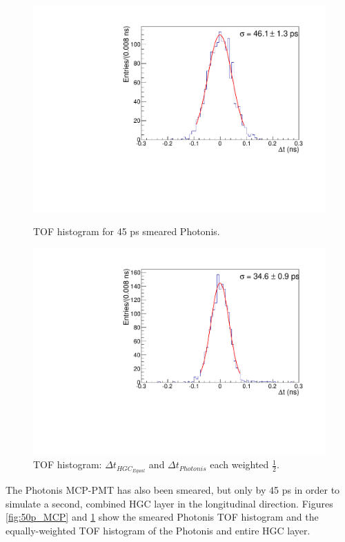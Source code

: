 \documentclass[twocolumn,aps,prd,reprint,superscriptaddress,floatfix]{revtex4-1}
\begin{document}
\begin{figure}[!htbp]
\centering
\begin{minipage}[t]{.49\textwidth}
	\centering
	\includegraphics[width=\linewidth]{deltaTMCPSmear50.pdf}
	\caption{TOF histogram for 45 ps smeared Photonis.}
	\label{fig:50p_MCP}
\end{minipage}\hfill
\begin{minipage}[t]{.49\textwidth}
	\centering
	\includegraphics[width=\linewidth]{deltaT_PicoSilEqual_MCP_Equal_BothSmear50.pdf}
	\caption{TOF histogram: $\Delta t_{HGC_{Equal}}$ and $\Delta t_{Photonis}$ each weighted $\frac{1}{2}$.}
	\label{fig:50ps_HGCequal_MCP}
\end{minipage}
\end{figure}

The Photonis MCP-PMT has also been smeared, but only by 45 ps in order to simulate a second, combined HGC layer in the longitudinal direction. 
Figures \ref{fig:50p_MCP} and \ref{fig:50ps_HGCequal_MCP} show the smeared Photonis TOF histogram and the equally-weighted TOF histogram of the Photonis and entire HGC layer.
\end{document}
